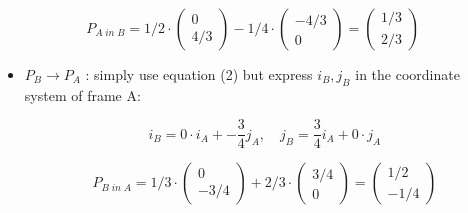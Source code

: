 \documentclass{article}
\begin{document}
{\begin{itemize}
            \begin{equation}
                P_{A \; \textit{in} \; B} 
                = 1/2 \cdot 
                \begin{pmatrix}
                    0 \\ 4/3
                \end{pmatrix}
                -1/4 \cdot 
                \begin{pmatrix}
                    -4/3 \\ 0
                \end{pmatrix} 
                = 
                \begin{pmatrix}
                    1/3 \\ 2/3
                \end{pmatrix}
            \end{equation}  
    \end{itemize}

    \begin{itemize}
        \item $P_{B} \rightarrow P_{A}$ : simply use equation (2) but express $i_{B},j_{B}$ in the coordinate system of frame A:
            
        \begin{equation}
            i_{B} = 0 \cdot i_{A} + -\frac{3}{4} j_{A} , \quad j_{B} = \frac{3}{4} i_{A} + 0 \cdot j_{A}
        \end{equation}

            \begin{equation}
                P_{B \; \textit{in} \; A} 
                = 1/3 \cdot 
                \begin{pmatrix}
                    0 \\ -3/4
                \end{pmatrix}
                + 2/3 \cdot 
                \begin{pmatrix}
                    3/4 \\ 0
                \end{pmatrix} 
                = 
                \begin{pmatrix}
                    1/2 \\ -1/4
                \end{pmatrix}
            \end{equation}  
    \end{itemize}


}
\end{document}
